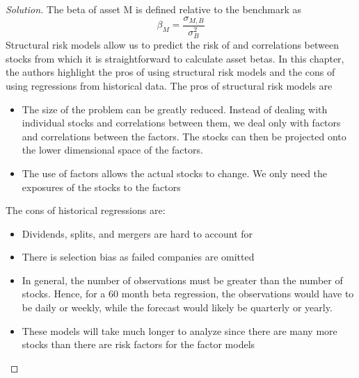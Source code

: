 \begin{proof}[Solution]
 The beta of asset M is defined relative to the benchmark as
 \begin{equation*}
  \beta_{M}=\frac{\sigma_{M,B}}{\sigma_{B}^{2}}
 \end{equation*}
 Structural risk models allow us to predict the risk of and correlations between stocks from which it is straightforward to calculate asset betas. In this chapter, the authors highlight the pros of using structural risk models and the cons of using regressions from historical data. The pros of structural risk models are
 \begin{itemize}
  \item{The size of the problem can be greatly reduced. Instead of dealing with individual stocks and correlations between them, we deal only with factors and correlations between the factors. The stocks can then be projected onto the lower dimensional space of the factors.}
  \item{The use of factors allows the actual stocks to change. We only need the exposures of the stocks to the factors}
 \end{itemize}
 The cons of historical regressions are:
 \begin{itemize}
  \item{ Dividends, splits, and mergers are hard to account for}
  \item{ There is selection bias as failed companies are omitted}
  \item{In general, the number of observations must be greater than the number of stocks. Hence, for a 60 month beta regression, the observations would have to be daily or weekly, while the forecast would likely be quarterly or yearly.}
  \item{These models will take much longer to analyze since there are many more stocks than there are risk factors for the factor models}
 \end{itemize}



\end{proof}


